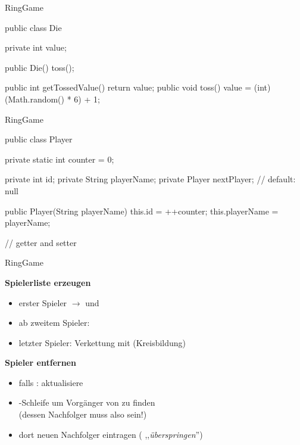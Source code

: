 \begin{frame}[fragile]{RingGame}
    \begin{solve}
    \begin{plainjava}
public class Die {
    private int value;
    
    public Die() {toss();}

    public int getTossedValue() {return value;}
    public void toss() {
        value = (int)(Math.random() * 6) + 1;
    }
}
    \end{plainjava}
    \end{solve}
\end{frame}
\resetframecounters
\begin{frame}[fragile]{RingGame}
    \begin{solve}
    \begin{plainjava}
public class Player {
    private static int counter = 0;

    private int id;
    private String playerName;
    private Player nextPlayer; // default: null

    public Player(String playerName) {
        this.id = ++counter;
        this.playerName = playerName;
    }

    // getter and setter
}
    \end{plainjava}
    \end{solve}
\end{frame}
\resetframecounters
\begin{frame}[fragile]{RingGame}
    \begin{solve}
        \textbf{Spielerliste erzeugen}
        \begin{itemize}
            \item erster Spieler $\rightarrow$  und 
            \item ab zweitem Spieler: 
            \item letzter Spieler: Verkettung mit  (Kreisbildung)
        \end{itemize}
        \textbf{Spieler entfernen}
        \begin{itemize}
            \item falls : aktualisiere 
            \item {}-Schleife um Vorgänger von  zu finden\\
            (dessen Nachfolger muss also  sein!)
            \item dort neuen Nachfolger eintragen ( ,,\textit{überspringen}'')
        \end{itemize}
    \end{solve}
\end{frame}